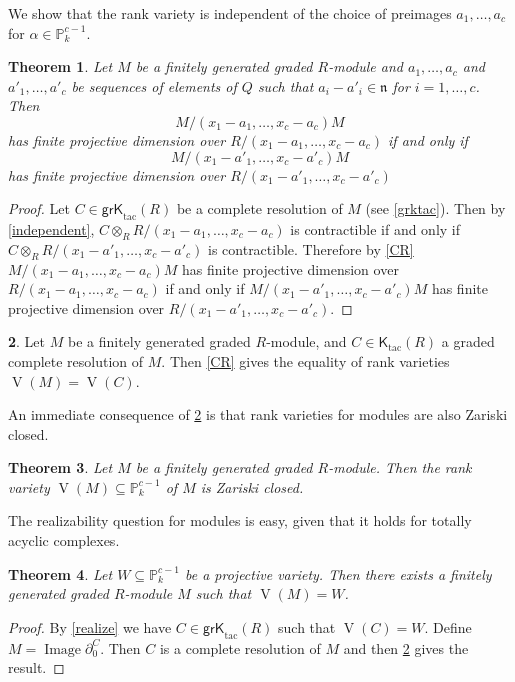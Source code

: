 \documentclass{amsart}[11pt]
\newcommand{\n}{{\mathfrak n}}
\newcommand{\Image}{\operatorname{Image}}
\newcommand{\V}{\operatorname{V}}
\newcommand{\Ktac}{\operatorname{\mathsf{K}_{tac}}\nolimits}
\newcommand{\grKtac}{\operatorname{\mathsf{grK}_{tac}}\nolimits}
\numberwithin{equation}{section}
\theoremstyle{plain}
\newtheorem{theorem}{Theorem}[section]
\newtheorem*{Main Theorem}{Main Theorem}
\theoremstyle{definition}
\newtheorem{chunk}[theorem]{}
\theoremstyle{remark}
\numberwithin{equation}{theorem}
\begin{document}
We show that the rank variety is independent of the choice of preimages 
$a_1,\dots,a_c$ for $\alpha\in\mathbb P^{c-1}_k$. 

\begin{theorem} Let $M$ be a finitely generated graded $R$-module and $a_1,\dots,a_c$ and $a'_1,\dots,a'_c$ be sequences of elements of $Q$ such that $a_i-a'_i\in\n$ for $i=1,\dots,c$. Then
\[
M/(x_1-a_1,\dots,x_c-a_c)M
\] 
has finite projective dimension over $R/(x_1-a_1,\dots,x_c-a_c)$ if and only if 
\[
M/(x_1-a'_1,\dots,x_c-a'_c)M
\] 
has finite projective dimension over $R/(x_1-a'_1,\dots,x_c-a'_c)$ 
\end{theorem}

\begin{proof} Let $C\in\grKtac(R)$ be a complete resolution of $M$ (see \ref{grktac}). Then by 
\ref{independent},  
$C\otimes_RR/(x_1-a_1,\dots,x_c-a_c)$ is contractible if and only if 
$C\otimes_RR/(x_1-a'_1,\dots,x_c-a'_c)$ is contractible. Therefore by \ref{CR} $M/(x_1-a_1,\dots,x_c-a_c)M$ 
has finite projective dimension over $R/(x_1-a_1,\dots,x_c-a_c)$ if and only if 
$M/(x_1-a'_1,\dots,x_c-a'_c)M$ 
has finite projective dimension over $R/(x_1-a'_1,\dots,x_c-a'_c)$.
\end{proof}

\begin{chunk}\label{varieties=}
Let $M$ be a finitely generated graded $R$-module, and $C\in\Ktac(R)$ a graded complete resolution of $M$.  Then \ref{CR} gives the equality of rank varieties $\V(M)=\V(C)$.
\end{chunk}

An immediate consequence of \ref{varieties=} is that rank varieties for modules are also Zariski closed. 

\begin{theorem}\label{closedM} Let $M$ be a finitely generated graded $R$-module. Then the rank variety 
$\V(M)\subseteq\mathbb P^{c-1}_k$ of $M$ is Zariski closed.
\end{theorem}

The realizability question for modules is easy, given that it holds for totally acyclic complexes.

\begin{theorem}\label{realizeM} Let $W\subseteq \mathbb P^{c-1}_k$ be a projective variety.  Then there exists a 
finitely generated graded $R$-module $M$ such that $\V(M)=W$.
\end{theorem}

\begin{proof} By \ref{realize} we have $C\in\grKtac(R)$ such that $\V(C)=W$.  
Define $M=\Image\partial^C_0$. Then $C$ is a complete resolution of $M$ and then 
\ref{varieties=} gives the result.
\end{proof}
\end{document}
